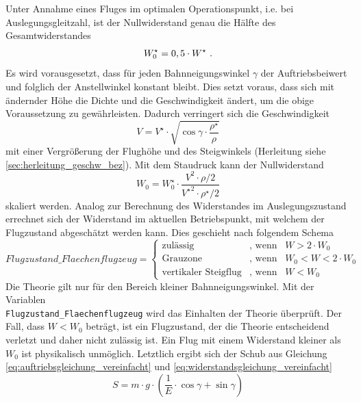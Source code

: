Unter Annahme eines Fluges im optimalen Operationspunkt, i.e. bei Auslegungsgleitzahl, ist der Nullwiderstand genau die Hälfte des Gesamtwiderstandes \cite[S.82-S.83]{Bruning.1986}
\begin{equation}
	W_0^\star = 0,5\cdot W^\star ~\text{.}
\end{equation}
Es wird vorausgesetzt, dass für jeden Bahnneigungswinkel \ensuremath{\gamma} der Auftriebsbeiwert und folglich der Anstellwinkel konstant bleibt. Dies setzt voraus, dass sich mit ändernder Höhe die Dichte und die Geschwindigkeit ändert, um die obige Voraussetzung zu gewährleisten. Dadurch verringert sich die Geschwindigkeit
\begin{equation}
	V = V^\star\cdot\sqrt{\cos\gamma\cdot\frac{\rho^\star}{\rho}}  \label{eq:geschw_flaechenflugzeug}
\end{equation}
mit einer Vergrößerung der Flughöhe und des Steigwinkels (Herleitung siehe \ref{sec:herleitung_geschw_bez}). Mit dem Staudruck kann der Nullwiderstand 
\begin{equation}
	W_0 = W_0^\star\cdot\frac{V^2\cdot\rho/2}{{V^\star}^2\cdot\rho^\star/2}
	\label{eq:geschwindigkeit_skalierung}
\end{equation}
skaliert werden.
Analog zur Berechnung des Widerstandes im Auslegungszustand errechnet sich der Widerstand im aktuellen Betriebspunkt, mit welchem der Flugzustand abgeschätzt werden kann. Dies geschieht nach folgendem Schema
\begin{equation}
Flugzustand\_Flaechenflugzeug = \begin{cases} 
\text{zulässig} & \text{, wenn} \;\;\; W > 2\cdot W_0 \\ 
\text{Grauzone} & \text{, wenn} \;\;\; W_0 < W < 2\cdot W_0 \\ 
\text{vertikaler Steigflug}  & \text{, wenn} \;\;\; W < W_0 
\end{cases}
\end{equation} 
Die Theorie gilt nur für den Bereich kleiner Bahnneigungswinkel. Mit der Variablen \\ \texttt{Flugzustand\_Flaechenflugzeug} wird das Einhalten der Theorie überprüft. Der Fall, dass \ensuremath{W < W_0} beträgt, ist ein Flugzustand, der die Theorie entscheidend verletzt und daher nicht zulässig ist. Ein Flug mit einem Widerstand kleiner als \ensuremath{W_0} ist physikalisch unmöglich.
Letztlich ergibt sich der Schub aus Gleichung \eqref{eq:auftriebsgleichung_vereinfacht} und \eqref{eq:widerstandsgleichung_vereinfacht}
\begin{equation}
	S = m\cdot g\cdot (\frac{1}{E}\cdot\cos\gamma + \sin\gamma) \label{eq:schub_flaechenflugzeug}
\end{equation}
